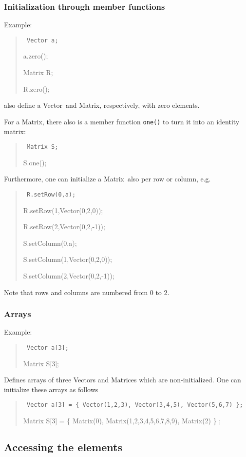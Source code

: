 \documentclass[12pt,twoside]{article}
\newcommand{\Vector}{{Vector}}
\newcommand{\Matrix}{{Matrix}}
\begin{document}
  \subsubsection{Initialization through member functions}
  Example:
    \begin{quote}\tt
         Vector a;

	 a.zero();

         Matrix R;

	 R.zero();
    \end{quote}
    also define a \Vector\ and \Matrix, respectively, with zero
    elements.
    
\noindent
    For a \Matrix, there also is a member function {\tt one()} to turn
    it into an identity matrix:
    \begin{quote}\tt
         Matrix S;

	 S.one();
    \end{quote}
    Furthermore, one can initialize a \Matrix\ also per row or column, e.g.
    \begin{quote}\tt
      R.setRow(0,a);

      R.setRow(1,Vector(0,2,0));

      R.setRow(2,Vector(0,2,-1));

      S.setColumn(0,a);

      S.setColumn(1,Vector(0,2,0));

      S.setColumn(2,Vector(0,2,-1));
    \end{quote}  
    Note that rows and columns are numbered from 0 to 2.


 \subsubsection{Arrays}
     Example:
    \begin{quote}\tt
         Vector a[3];

         Matrix S[3];
    \end{quote}
    Defines arrays of three Vectors and Matrices which are
    non-initialized. One can initialize these arrays as follows
    \begin{quote}\tt
         Vector a[3] = \{ Vector(1,2,3), Vector(3,4,5), Vector(5,6,7) \};

         Matrix S[3] = \{ Matrix(0), Matrix(1,2,3,4,5,6,7,8,9), Matrix(2) \} ;
    \end{quote}

\subsection{Accessing the elements}
\label{bracketsnowtoo}
\end{document}
